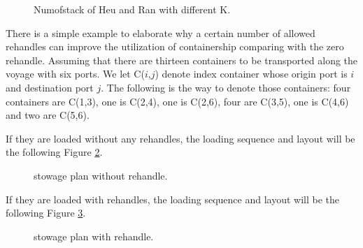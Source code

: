 \documentclass[review,3p,times,authoryear,12pt]{elsarticle}
\begin{document}
\begin{figure}[htbp]
\centering
\setlength{\abovecaptionskip}{10pt}
\caption{Numofstack of Heu and Ran with different K.}
\label{fig 2:graph}
\end{figure}

There is a simple example to elaborate why a certain number of allowed rehandles can improve the utilization of containership comparing with the zero rehandle.
Assuming that there are thirteen containers to be transported along the voyage with six ports.
We let C($i$,$j$) denote index container whose origin port is $i$ and destination port $j$.
The following is the way to denote those containers: four containers are C(1,3), one is C(2,4), one is C(2,6), four are C(3,5), one is C(4,6) and two are C(5,6).

If they are loaded without any rehandles, the loading sequence and layout will be the following Figure \ref{fig 3:graph}.
\begin{figure}[htbp]
\centering
\setlength{\abovecaptionskip}{10pt}
\caption{stowage plan without rehandle.}
\label{fig 3:graph}
\end{figure}


If they are loaded with rehandles, the loading sequence and layout will be the following Figure \ref{fig 4:graph}.
\begin{figure}[htbp]
\centering
\setlength{\abovecaptionskip}{10pt}
\caption{stowage plan with rehandle.}
\label{fig 4:graph}
\end{figure}
\end{document}
